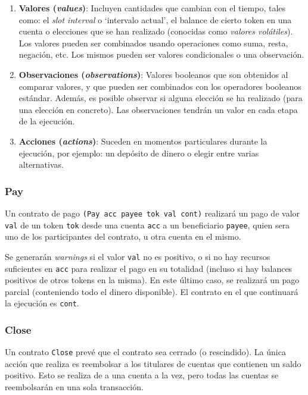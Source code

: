 \documentclass[12pt]{book}
\begin{document}
\begin{enumerate}
    \item \textbf{Valores (\textit{values})}: Incluyen cantidades que cambian con el tiempo, tales como: el \textit{slot interval} o `intervalo actual', el balance de cierto token en una cuenta o elecciones que se han realizado (conocidas como \textit{valores volátiles}). Los valores pueden ser combinados usando operaciones como suma, resta, negación, etc. Los mismos pueden ser valores condicionales o una observación.

	\item \textbf{Observaciones (\textit{observations})}: Valores booleanos que son obtenidos al comparar valores, y que pueden ser combinados con los operadores booleanos estándar. Además, es posible observar si alguna elección se ha realizado (para una elección en concreto). Las observaciones tendrán un valor en cada etapa de la ejecución.

	\item \textbf{Acciones (\textit{actions})}: Suceden en momentos particulares durante la ejecución, por ejemplo: un depósito de dinero o elegir entre varias alternativas.
\end{enumerate}


\subsubsection{Pay}
Un contrato de pago \texttt{(Pay acc payee tok val cont)} realizará un pago de valor \texttt{val} de un token \texttt{tok} desde una cuenta \texttt{acc} a un beneficiario \texttt{payee}, quien sera uno de los participantes del contrato, u otra cuenta en el mismo.

Se generarán \textit{warnings} si el valor \texttt{val} no es positivo, o si no hay recursos suficientes en \texttt{acc} para realizar el pago en su totalidad (incluso si hay balances positivos de otros tokens en la misma). En este último caso, se realizará un pago parcial (conteniendo todo el dinero disponible). El contrato en el que continuará la ejecución es \texttt{cont}.

\subsubsection{Close}\label{sec:Close}

Un contrato \texttt{Close} prevé que el contrato sea cerrado (o rescindido). La única acción que realiza es reembolsar a los titulares de cuentas que contienen un saldo positivo. Esto se realiza de a una cuenta a la vez, pero todas las cuentas se reembolsarán en una sola transacción.
\end{document}

